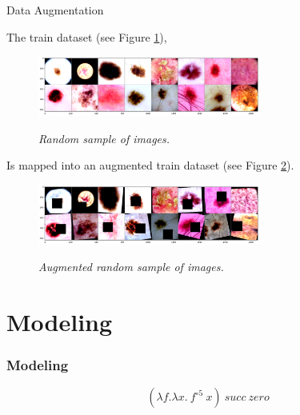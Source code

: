 \documentclass[dvipsnames,mathserif]{beamer}
\begin{document}
{\begin{frame}
    \end{frame}

    \begin{frame}

      \large Data Augmentation
      \vspace{0.25cm}

      \footnotesize

      The train dataset (see Figure \ref{fig:sample-of-datasets}),

      \begin{figure}[H]
        \centering
        \includegraphics[width=0.65\textwidth]{images/random-sample-of-isic.png}
        \caption[Random sample of images]{\footnotesize{\textit{Random sample of images.}}}
        {\label{fig:sample-of-datasets}}
      \end{figure}

      Is mapped into an augmented train dataset (see Figure \ref{fig:aug-sample-of-datasets}).

      \begin{figure}[H]
        \centering
        \includegraphics[width=0.65\textwidth]{images/random-sample-of-isic-augmented.png}
        \caption[Augmented random sample of images]{\footnotesize{\textit{Augmented random sample of images.}}}
        {\label{fig:aug-sample-of-datasets}}
      \end{figure}

    \end{frame}


    \section{Modeling}

    \begin{frame}
      \frametitle{Modeling}

      \[(\lambda f. \lambda x.\ f^{\circ 5}\ x)\ succ\ zero\]
    \end{frame}

}
\end{document}
